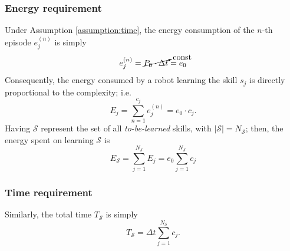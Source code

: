 \subsubsection{\textbf{Energy requirement}}
Under Assumption \ref{assumption:time}, the energy consumption of the $n$-th episode $e^{(n)}_j$ is simply
\begin{equation}\label{eq:energy_per_episode}
    e^{(n)}_j = \cancelto{\text{const}}{P_0\cdot \Delta t} = e_0
\end{equation}
Consequently, the energy consumed by a robot learning the skill $ s_j $ is directly proportional to the complexity; i.e.
\begin{equation}\label{eq:energy_per_skill}
    E_j =\sum_{n=1}^{c_j} e^{(n)}_j = e_0 \cdot c_j.
\end{equation}
Having $\mathcal{S}$ represent the set of all \emph{to-be-learned} skills, with $|\mathcal{S}| = N_\mathcal{S}$; then, the energy spent on learning $\mathcal{S}$ is
\begin{equation}\label{eq:total_energy}
	E_{\mathcal{S}} = \sum_{j=1}^{{N_{\mathcal{S}}}} E_j = e_0 \sum_{j=1}^{{N_{\mathcal{S}}}} c_j%
\end{equation}
\subsubsection{\textbf{Time requirement}}
Similarly, the total time $T_{\mathcal{S}}$ is simply
\begin{equation}\label{eq:total_energy}
	T_{\mathcal{S}} = \Delta t \sum_{j=1}^{{N_{\mathcal{S}}}} c_j.
\end{equation}
